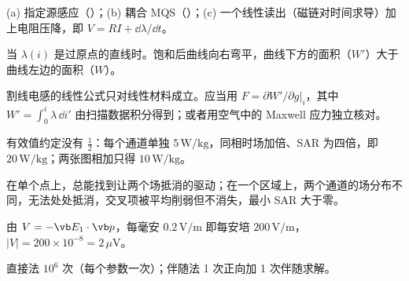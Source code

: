 \begin{answers}
\item (a) 指定源感应（）；(b) 耦合 MQS（）；(c) 一个线性读出（磁链对时间求导）加上电阻压降，即 $V=RI+\dd\lambda/\dd t$。
\item 当 $\lambda(i)$ 是过原点的直线时。饱和后曲线向右弯平，曲线下方的面积（$W'$）大于曲线左边的面积（$W$）。
\item 割线电感的线性公式只对线性材料成立。应当用 $F=\partial W'/\partial g|_i$，其中 $W'=\int_0^i\lambda\,\dd i'$ 由扫描数据积分得到；或者用空气中的 Maxwell 应力独立核对。
\item 有效值约定没有 $\tfrac12$：每个通道单独 $5\,\mathrm{W/kg}$，同相时场加倍、SAR 为四倍，即 $20\,\mathrm{W/kg}$；两张图相加只得 $10\,\mathrm{W/kg}$。
\item 在单个点上，总能找到让两个场抵消的驱动；在一个区域上，两个通道的场分布不同，无法处处抵消，交叉项被平均削弱但不消失，最小 SAR 大于零。
\item 由 $V=-\vb E_1\cdot\vb p$，每毫安 $0.2\,\mathrm{V/m}$ 即每安培 $200\,\mathrm{V/m}$，$|V|=200\times10^{-8}=2\,\mu\mathrm V$。
\item 直接法 $10^6$ 次（每个参数一次）；伴随法 1 次正向加 1 次伴随求解。
\end{answers}

